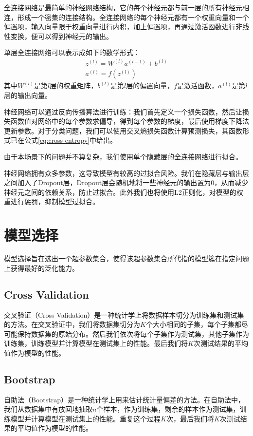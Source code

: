 \documentclass{article}
\begin{document}
全连接网络是最简单的神经网络结构，它的每个神经元都与前一层的所有神经元相连，形成一个密集的连接结构。全连接网络的每个神经元都有一个权重向量和一个偏置项，输入向量限于权重向量进行内积，加上偏置项，再通过激活函数进行非线性变换，便可以得到神经元的输出。

单层全连接网络可以表示成如下的数学形式：
\begin{align}
z^{(l)} = W^{(l)}a^{(l-1)} + b^{(l)}\\
a^{(l)} = f(z^{(l)})
\end{align}
其中$W^{(l)}$是第$l$层的权重矩阵，$b^{(l)}$是第$l$层的偏置向量，$f$是激活函数，$a^{(l)}$是第$l$层的输出向量。

神经网络可以通过反向传播算法进行训练：我们首先定义一个损失函数，然后让损失函数值对网络中的每个参数求偏导，得到每个参数的梯度，最后使用梯度下降法更新参数。对于分类问题，我们可以使用交叉熵损失函数计算预测损失，其函数形式已在公式\ref{eq:cross-entropy}中给出。

由于本场景下的问题并不算复杂，我们使用单个隐藏层的全连接网络进行拟合。

神经网络拥有众多参数，这导致模型有较高的过拟合风险。我们在隐藏层与输出层之间加入了Dropout层，Dropout层会随机地将一些神经元的输出置为0，从而减少神经元之间的依赖关系，防止过拟合。此外我们也将使用L2正则化，对模型的权重进行惩罚，抑制模型过拟合。


\section{模型选择}

模型选择旨在选出一个超参数集合，使得该超参数集合所代指的模型簇在指定问题上获得最好的泛化能力。

\subsection{Cross Validation}

交叉验证（Cross Validation）是一种统计学上将数据样本切分为训练集和测试集的方法。在交叉验证中，我们将数据集切分为$K$个大小相同的子集，每个子集都尽可能保持数据集的原始分布。然后我们依次将每个子集作为测试集，其他子集作为训练集，训练模型并计算模型在测试集上的性能。最后我们将$K$次测试结果的平均值作为模型的性能。

\subsection{Bootstrap}

自助法（Bootstrap）是一种统计学上用来估计统计量偏差的方法。在自助法中，我们从数据集中有放回地抽取$n$个样本，作为训练集，剩余的样本作为测试集，训练模型并计算模型在测试集上的性能。重复这个过程$K$次，最后我们将$K$次测试结果的平均值作为模型的性能。
\end{document}
